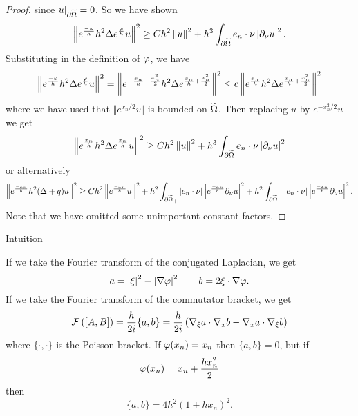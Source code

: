\begin{proof}
  since $u|_{\partial\widetilde\Omega} = 0$.
  So we have shown
  \[ \left\lVert  e^\frac{-\varphi}{h} h^2 \Delta e^\frac{\varphi} h u  \right\rVert^2 \geq Ch^2\left\lVert u \right\rVert^2 + h^3 \int_{\partial\widetilde\Omega} e_n \cdot \nu \left\lvert \partial_\nu u \right\rvert^2. \]
  Substituting in the definition of $\varphi$, we have
  \[ \left\lVert  e^\frac{-\varphi}{h} h^2 \Delta e^\frac{\varphi} h u  \right\rVert^2 = \left\lVert  e^{-\frac{x_n}{h}-\frac{x_n^2}{2}} h^2 \Delta e^{\frac{x_n}{h}+\frac{x_n^2}{2}}  \right\rVert^2 \leq c \left\lVert  e^{\frac{x_n}{h}} h^2 \Delta e^{\frac{x_n}{h}+\frac{x_n^2}{2}}  \right\rVert^2 \]
  where we have used that $\Vert e^{x_n/2}v \Vert$ is bounded on $\widetilde\Omega$.
  Then replacing $u$ by $e^{-x_n^2/2}u$ we get
  \[ \left\lVert  e^\frac{x_n}{h} h^2 \Delta e^\frac{x_n}h u  \right\rVert^2 \geq Ch^2\left\lVert u \right\rVert^2 + h^3 \int_{\partial\widetilde\Omega} e_n \cdot \nu \left\lvert \partial_\nu u \right\rvert^2 \]
  or alternatively
  \[ \left\lVert  e^\frac{-x_n}{h} h^2 (\Delta+q)u  \right\rVert^2 \geq Ch^2 \left\lVert e^\frac{-x_n}{h} u  \right\rVert^2 + h^2 \int_{\partial\widetilde\Omega_+} \left\lvert e_n \cdot \nu \right\rvert \left\lvert  e^\frac{-x_n}{h} \partial_\nu u  \right\rvert^2 + h^2 \int_{\partial\widetilde\Omega_-} \left\lvert e_n \cdot \nu \right\rvert \left\lvert  e^\frac{-x_n}{h} \partial_\nu u  \right\rvert^2. \]
  Note that we have omitted some unimportant constant factors.
\end{proof}

Intuition

If we take the Fourier transform of the conjugated Laplacian, we get
\[ a = \left\lvert \xi \right\rvert^2 - \left\lvert \nabla\varphi \right\rvert^2 \qquad b = 2\xi \cdot \nabla\varphi. \]
If we take the Fourier transform of the commutator bracket, we get
\[ \mathcal{F} \left( [A,B] \right) = \frac{h}{2i}\{a,b\} = \frac{h}{2i} \left( \nabla_\xi a \cdot \nabla_x b - \nabla_x a \cdot \nabla_\xi b \right) \]
where $\{\cdot,\cdot\}$ is the Poisson bracket.
If $\varphi(x_n)=x_n$ then $\{a,b\}=0$, but if
\[ \varphi(x_n)=x_n + \frac{hx_n^2}{2} \]
then
\[ \{a,b\} = 4h^2(1+hx_n)^2. \]
